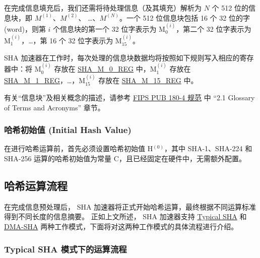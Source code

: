 \documentclass[main\_\_CN.tex]{subfiles}
\begin{document}
在完成信息填充后，我们还需将待处理信息（及其填充）解析为 \begin{math}N\end{math} 个 512 位的信息块，即 \begin{math}M^{(1)}\end{math}、\begin{math}M^{(2)}\end{math}、 \dots、\begin{math}M^{(N)}\end{math}。一个 512 位信息块包括 16 个 32 位的字 (word)，则第 \begin{math}i\end{math} 个信息块的第一个 32 位字表示为 M$^{(i)}_{0}$，第二个 32 位字表示为 M$^{(i)}_{1}$，\dots，第 16 个 32 位字表示为 M$^{(i)}_{15}$。

SHA 加速器在工作时，每次处理的信息块数据均将按照如下规则写入相应的寄存器中：将 M$^{(i)}_{0}$ 存放在 \hyperref[regdesc:SHAMNREG]{SHA\_M\_0\_REG} 中，M$^{(i)}_1$ 存放在 \hyperref[regdesc:SHAMNREG]{SHA\_M\_1\_REG}，\dots，M$^{(i)}_{15}$ 存放在 \hyperref[regdesc:SHAMNREG]{SHA\_M\_15\_REG} 中。

\begin{tiplisting}
有关“信息块”及相关概念的描述，请参考 \href{https://doi.org/10.6028/NIST.FIPS.180-4}{FIPS PUB 180-4 规范} 中 “2.1 Glossary of Terms and Acronyms” 章节。
\end{tiplisting}

\subsubsection{哈希初始值 (Initial Hash Value)}\label{sec:sha-set-initial-hash}
在进行哈希运算前，首先必须设置哈希初始值 H$^{(0)}$，其中 SHA-1、SHA-224 和 SHA-256 运算的哈希初始值为常量 C，且已经固定在硬件中，无需额外配置。

\subsection{哈希运算流程}\label{sec:sha-hash-operation}

在完成信息预处理后，\chipname{} SHA 加速器将正式开始哈希运算，最终根据不同运算标准得到不同长度的信息摘要。
正如上文所述，\chipname{} SHA 加速器支持 \hyperref[sec:sha-typical-sha]{Typical SHA} 和 \hyperref[sec:sha-dma-sha]{DMA-SHA} 两种工作模式，下面将对这两种工作模式的具体流程进行介绍。

\subsubsection{Typical SHA 模式下的运算流程}\label{sec:sha-typical-sha}
\end{document}
